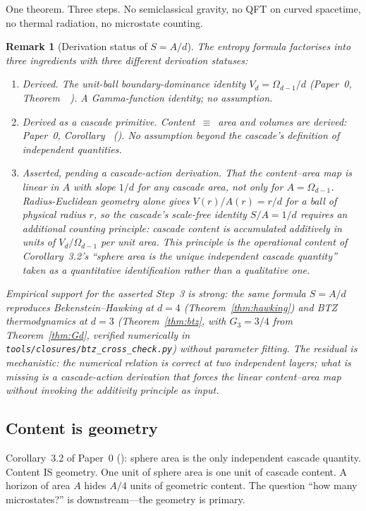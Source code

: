 \documentclass[12pt,a4paper]{article}
\newtheorem*{remark}{Remark}
\begin{document}
One theorem. Three steps. No semiclassical gravity, no QFT on curved spacetime,
no thermal radiation, no microstate counting.

\begin{remark}[Derivation status of $S = A/d$]\label{rem:sp23-status}
The entropy formula factorises into three ingredients with three different
derivation statuses:
\begin{enumerate}
\item \emph{Derived.} The unit-ball boundary-dominance identity
$V_d = \Omega_{d-1}/d$ (Paper~0, Theorem~~\cite{part0}). A Gamma-function
identity; no assumption.
\item \emph{Derived as a cascade primitive.} Content~$\equiv$~area and
volumes are derived: Paper~0, Corollary~ ().
No assumption beyond the cascade's definition of independent quantities.
\item \emph{Asserted, pending a cascade-action derivation.} That the
content--area map is linear in $A$ with slope $1/d$ for \emph{any} cascade
area, not only for $A = \Omega_{d-1}$. Radius-Euclidean geometry alone gives
$V(r)/A(r) = r/d$ for a ball of physical radius $r$, so the cascade's
scale-free identity $S/A = 1/d$ requires an additional counting principle:
cascade content is accumulated additively in units of $V_d/\Omega_{d-1}$ per
unit area. This principle is the operational content of
Corollary~3.2's ``sphere area is the unique independent cascade quantity''
taken as a quantitative identification rather than a qualitative one.
\end{enumerate}
Empirical support for the asserted Step~3 is strong: the same formula
$S = A/d$ reproduces Bekenstein--Hawking at $d=4$ (Theorem~\ref{thm:hawking})
and BTZ thermodynamics at $d=3$ (Theorem~\ref{thm:btz}, with
$G_3 = 3/4$ from Theorem~\ref{thm:Gd}, verified numerically in
\texttt{tools/closures/btz\_cross\_check.py}) without parameter fitting. The
residual is mechanistic: the numerical relation is correct at two
independent layers; what is missing is a cascade-action derivation that
forces the linear content--area map without invoking the additivity
principle as input.
\end{remark}

\subsection{Content is geometry}

Corollary~3.2 of Paper~0 (): sphere area is the only
independent cascade quantity. Content IS geometry. One unit of sphere area
is one unit of cascade content. A horizon of area $A$ hides $A/4$ units of
geometric content. The question ``how many microstates?'' is
downstream---the geometry is primary.
\end{document}
